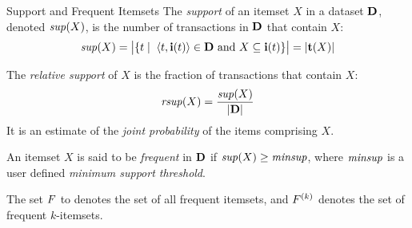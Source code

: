 \begin{frame}{Support and Frequent Itemsets}
The {\em support}
of an itemset $X$ in a dataset $\mathbf{D}$, denoted
$\mathit{sup}(X)$, is the number of transactions in $\mathbf{D}$ that
contain $X$:
\begin{align*}
\mathit{sup}(X) = \bigl|\{ t \mid \; \langle t,{\mathbf{i}}(t) \rangle \in \mathbf{D} \mbox{ and
} X \subseteq {\mathbf{i}}(t) \}\bigr| = |{\mathbf{t}}(X)|
\end{align*}

\medskip
The {\em relative support}
of $X$ is the fraction of
transactions that contain $X$:
\begin{align*}
\mathit{rsup}(X) = \frac{\mathit{sup}(X)}{|\mathbf{D}|}
\end{align*}
It is an estimate of the {\em joint
  probability} of
the items comprising $X$.

\medskip
An itemset $X$ is said to be {\em frequent}
in $\mathbf{D}$ if $\mathit{sup}(X) \geq
\mathit{minsup}$, where $\mathit{minsup}$ is a user def\/{i}ned {\em minimum support
threshold}.

\medskip
The set ${\relax F}$ to denotes the
set of all frequent itemsets, and ${\relax F}^{(k)}$ denotes the set of
frequent $k$-itemsets.

\end{frame}

